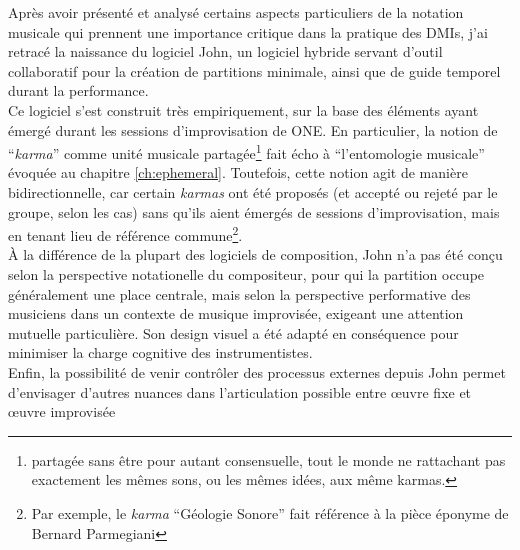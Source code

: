 \noindent Après avoir présenté et analysé certains aspects particuliers de la notation musicale qui prennent une importance critique dans la pratique des \glspl{DMI}, j'ai retracé la naissance du logiciel John, un logiciel hybride servant d'outil collaboratif pour la création de partitions minimale, ainsi que de guide temporel durant la performance.\\
\indent Ce logiciel s'est construit très empiriquement, sur la base des éléments ayant émergé durant les sessions d'improvisation de ONE. En particulier, la notion de ``\textit{karma}'' comme unité musicale partagée\footnote{partagée sans être pour autant consensuelle, tout le monde ne rattachant pas exactement les mêmes sons, ou les mêmes idées, aux même karmas.} fait écho à ``l'entomologie musicale'' évoquée au chapitre \ref{ch:ephemeral}. Toutefois, cette notion agit de manière bidirectionnelle, car certain \textit{karmas} ont été proposés (et accepté ou rejeté par le groupe, selon les cas) sans qu'ils aient émergés de sessions d'improvisation, mais en tenant lieu de référence commune\footnote{Par exemple, le \textit{karma} ``Géologie Sonore'' fait référence à la pièce éponyme de Bernard Parmegiani}.\\
\indent À la différence de la plupart des logiciels de composition, John n'a pas été conçu selon la perspective notationelle du compositeur, pour qui la partition occupe généralement une place centrale, mais selon la perspective performative des musiciens dans un contexte de musique improvisée, exigeant une attention mutuelle particulière. Son design visuel a été adapté en conséquence pour minimiser la charge cognitive des instrumentistes.\\
\indent Enfin, la possibilité de venir contrôler des processus externes depuis John permet d'envisager d'autres nuances dans l'articulation possible entre œuvre fixe et œuvre improvisée






